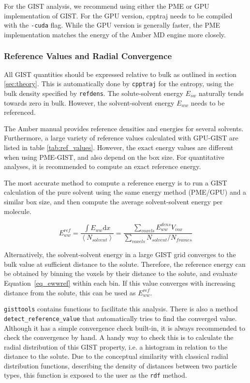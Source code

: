\documentclass[9pt,tutorial]{livecoms}
\newcommand{\software}{\texttt}
\newcommand\inlinecode{\texttt}
\begin{document}
For the GIST analysis, we recommend using either the PME or GPU implementation of GIST.
For the GPU version, cpptraj needs to be compiled with the \inlinecode{-cuda} flag.
While the GPU version is generally faster, the PME implementation matches the energy of the Amber MD engine more closely.

\subsubsection{Reference Values and Radial Convergence}
All GIST quantities should be expressed relative to bulk as outlined in section \ref{sec:theory}.
This is automatically done by \software{cpptraj} for the entropy, using the bulk density specified by \inlinecode{refdens}.
The solute-solvent energy $E_{sw}$ naturally tends towards zero in bulk.
However, the solvent-solvent energy $E_{ww}$ needs to be referenced.

The Amber manual provides reference densities and energies for several solvents.
Furthermore, a large variety of reference values calculated with GPU-GIST are listed in table \ref{tab:ref_values}.
However, the exact energy values are different when using PME-GIST, and also depend on the box size.
For quantitative analyses, it is recommended to compute an exact reference energy.

The most accurate method to compute a reference energy is to run a GIST calculation of the pure solvent using the same energy method (PME/GPU) and a similar box size, and then compute the average solvent-solvent energy per molecule.

\begin{equation}
\label{eq_ewwref}
E_{ww}^\textit{ref} = \frac{\int{E_{ww}} \mathrm{d}x}{\left<N_\textit{solvent}\right>}
  = \frac{\sum_\textit{voxels}E_{ww}^\textit{dens} V_\textit{vox}}{\sum_\textit{voxels}{N_\textit{solvent}} / N_\textit{frames}}
\end{equation}

Alternatively, the solvent-solvent energy in a large GIST grid converges to the bulk value at sufficient distance to the solute.
Therefore, the reference energy can be obtained by binning the voxels by their distance to the solute, and evaluate Equation~\ref{eq_ewwref} within each bin.
If this value converges with increasing distance from the solute, this can be used as $E_{ww}^\textit{ref}$.

\software{gisttools} contains functions to facilitate this analysis.
There is also a method \inlinecode{detect\_reference\_value} that automatically tries to find the converged value.
Although it has a simple convergence check built-in, it is always recommended to check the convergence by hand. A handy way to check this is to calculate the radial distribution of this GIST property, i.e. a histogram in relation to the distance to the solute. Due to the conceptual similarity with classical radial distribution functions, describing the density of distances between two particle types, this function is exposed to the user as the \inlinecode{rdf} method.
\end{document}
